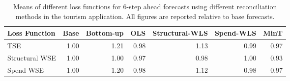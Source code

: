 \begin{table}[ht]
\centering
\begin{tabular}{lrrrrrr}
  \hline
Loss Function & Base & Bottom-up & OLS & Structural-WLS & Spend-WLS & MinT \\ 
  \hline
TSE & 1.00 & 1.21 & 0.98 & 1.13 & 0.99 & 0.97 \\ 
  Structural WSE & 1.00 & 1.00 & 0.97 & 0.98 & 1.00 & 0.93 \\ 
  Spend WSE & 1.00 & 1.20 & 0.98 & 1.12 & 0.98 & 0.97 \\ 
   \hline
\end{tabular}
\caption{Means of different loss functions for 6-step ahead forecasts using different reconciliation methods in the tourism application.  All figures are reported relative to base forecasts.} 
\end{table}
